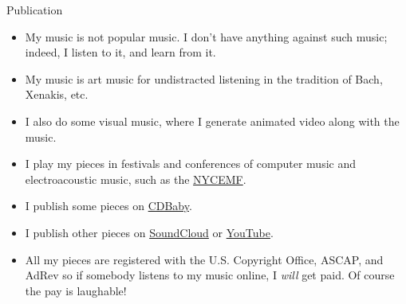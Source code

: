 \documentclass{beamer}
\begin{document}
\begin{frame}{Publication}
  \begin{itemize}
  \item
    My music is not popular music. I don't have anything against such music; indeed, I listen to it, and learn from it.
  \item
    My music is art music for undistracted listening in the tradition of Bach, Xenakis, etc.
  \item
	I also do some visual music, where I generate animated video along with the music.
  \item
    I play my pieces in festivals and conferences of computer music and electroacoustic music, such as the \href{http://nycemf.org}{NYCEMF}.
  \item
    I publish some pieces on \href{https://www.cdbaby.com/cd/gogins1}{CDBaby}.
  \item
    I publish other pieces on \href{https://soundcloud.com/michael-gogins}{SoundCloud} or \href{https://www.youtube.com/user/michaelgogins}{YouTube}.
  \item
    All my pieces are registered with the U.S. Copyright Office, ASCAP, and AdRev so if somebody listens to my music online, I \emph{will} get paid. Of course the pay is laughable!
  \end{itemize}
\end{frame}
\end{document}
